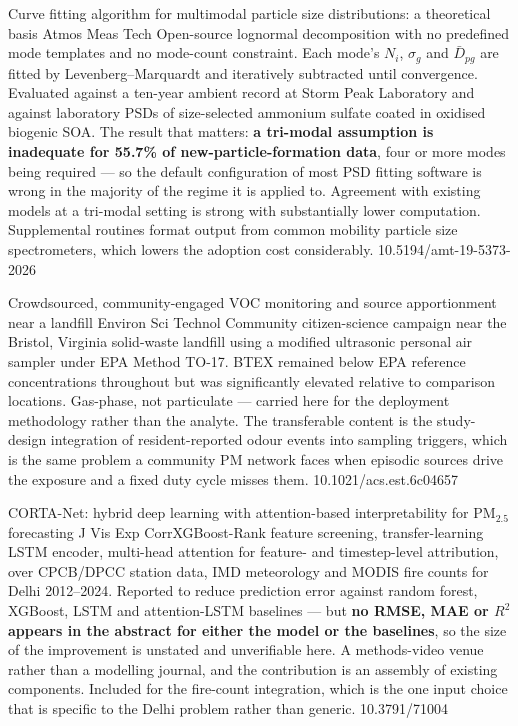 \documentclass[10pt]{article}
\begin{document}
{Curve fitting algorithm for multimodal particle size distributions: a theoretical basis}
{Atmos Meas Tech}
{Open-source lognormal decomposition with no predefined mode templates and no mode-count
constraint. Each mode's $N_i$, $\sigma_g$ and $\bar{D}_{pg}$ are fitted by
Levenberg--Marquardt and iteratively subtracted until convergence. Evaluated against a
ten-year ambient record at Storm Peak Laboratory and against laboratory PSDs of
size-selected ammonium sulfate coated in oxidised biogenic SOA. The result that matters:
\textbf{a tri-modal assumption is inadequate for 55.7\% of new-particle-formation data},
four or more modes being required --- so the default configuration of most PSD fitting
software is wrong in the majority of the regime it is applied to. Agreement with existing
models at a tri-modal setting is strong with substantially lower computation. Supplemental
routines format output from common mobility particle size spectrometers, which lowers the
adoption cost considerably.}
{10.5194/amt-19-5373-2026}

{Crowdsourced, community-engaged VOC monitoring and source apportionment near a landfill}
{Environ Sci Technol}
{Community citizen-science campaign near the Bristol, Virginia solid-waste landfill using
a modified ultrasonic personal air sampler under EPA Method TO-17. BTEX remained below EPA
reference concentrations throughout but was significantly elevated relative to comparison
locations. Gas-phase, not particulate --- carried here for the deployment methodology
rather than the analyte. The transferable content is the study-design integration of
resident-reported odour events into sampling triggers, which is the same problem a
community PM network faces when episodic sources drive the exposure and a fixed duty cycle
misses them.}
{10.1021/acs.est.6c04657}

{CORTA-Net: hybrid deep learning with attention-based interpretability for PM$_{2.5}$ forecasting}
{J Vis Exp}
{CorrXGBoost-Rank feature screening, transfer-learning LSTM encoder, multi-head attention
for feature- and timestep-level attribution, over CPCB/DPCC station data, IMD meteorology
and MODIS fire counts for Delhi 2012--2024. Reported to reduce prediction error against
random forest, XGBoost, LSTM and attention-LSTM baselines --- but \textbf{no RMSE, MAE or
$R^2$ appears in the abstract for either the model or the baselines}, so the size of the
improvement is unstated and unverifiable here. A methods-video venue rather than a
modelling journal, and the contribution is an assembly of existing components. Included
for the fire-count integration, which is the one input choice that is specific to the
Delhi problem rather than generic.}
{10.3791/71004}
\end{document}
